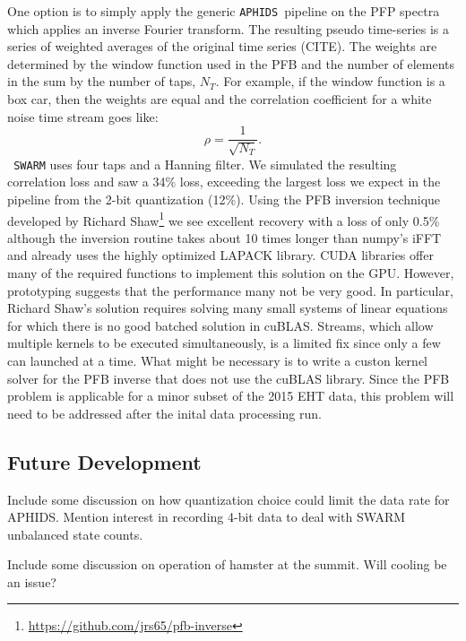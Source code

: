 \documentclass[11pt,preprint]{aastex}
\newcommand{\SWARM}[1]{\texttt{#1\,SWARM}}
\newcommand{\APHIDS}{\texttt{APHIDS}}
\begin{document}
One option is to simply apply the generic \APHIDS\, pipeline on the PFP spectra which applies an inverse Fourier 
transform.  The resulting pseudo time-series is a series of weighted 
averages of the original time series (CITE).  The weights are determined by the window function used in the 
PFB and the number of elements in the sum by the number of taps, $N_T$.  For example, if the window function is 
a box car, then the weights are equal and the correlation coefficient for a white noise time stream goes like:
\begin{equation}
\rho = \frac{1}{\sqrt{N_T}}.
\end{equation}
\SWARM{} uses four taps and a Hanning filter.  We simulated the resulting correlation loss and saw a 34\% loss, 
exceeding the largest loss we expect in the pipeline from the 2-bit quantization (12\%).  Using the PFB inversion
technique developed by Richard Shaw\footnote{\url{https://github.com/jrs65/pfb-inverse}} we see excellent 
recovery with a loss of only 0.5\% although the inversion routine takes about 10 times longer than numpy's
iFFT and already uses the highly optimized LAPACK library.  CUDA libraries offer many of the required functions 
to implement this solution on the GPU.  However, prototyping suggests that the performance many not be very good. 
In particular, Richard Shaw's solution requires solving many small systems of linear equations for which there is 
no good batched solution in cuBLAS. Streams, which allow multiple kernels to be executed simultaneously, is a 
limited fix since only a few can launched at a time.  What might be necessary is to write a custon kernel solver
for the PFB inverse that does not use the cuBLAS library.  Since the PFB problem is applicable for a minor subset 
of the 2015 EHT data, this problem will need to be addressed after the inital data processing run.

\subsection{Future Development}

Include some discussion on how quantization choice could limit the data rate for APHIDS. 
Mention interest in recording 4-bit data to deal with SWARM unbalanced state counts.

Include some discussion on operation of hamster at the summit.  Will cooling be an issue?
\end{document}
